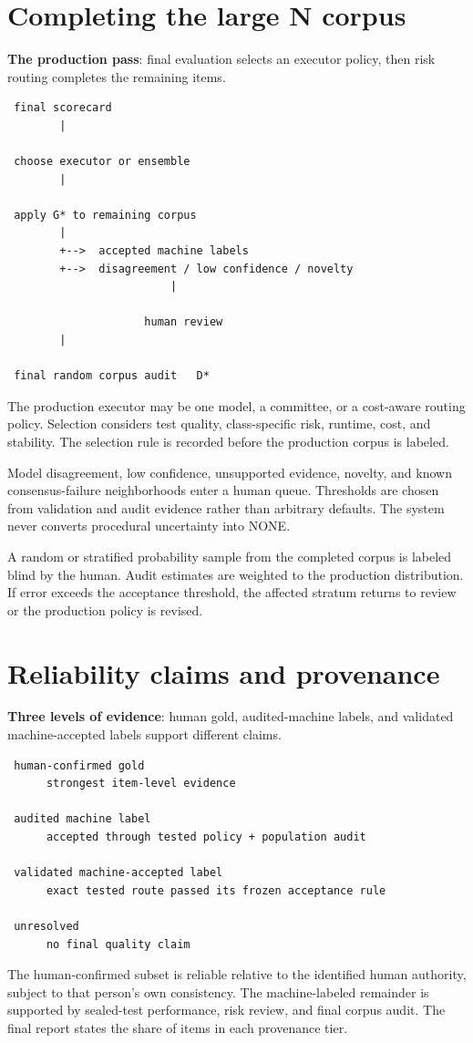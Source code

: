 \section{Completing the large N corpus}
\textbf{The production pass}: final evaluation selects an executor policy, then risk routing completes the remaining items.

\begin{verbatim}
 final scorecard
        |

 choose executor or ensemble
        |

 apply G* to remaining corpus
        |
        +-->  accepted machine labels
        +-->  disagreement / low confidence / novelty
                         |

                     human review
        |

 final random corpus audit   D*
\end{verbatim}
The production executor may be one model, a committee, or a cost-aware routing policy. Selection considers test quality, class-specific risk, runtime, cost, and stability. The selection rule is recorded before the production corpus is labeled.

Model disagreement, low confidence, unsupported evidence, novelty, and known consensus-failure neighborhoods enter a human queue. Thresholds are chosen from validation and audit evidence rather than arbitrary defaults. The system never converts procedural uncertainty into NONE.

A random or stratified probability sample from the completed corpus is labeled blind by the human. Audit estimates are weighted to the production distribution. If error exceeds the acceptance threshold, the affected stratum returns to review or the production policy is revised.


\section{Reliability claims and provenance}
\textbf{Three levels of evidence}: human gold, audited-machine labels, and validated machine-accepted labels support different claims.

\begin{verbatim}
 human-confirmed gold
      strongest item-level evidence

 audited machine label
      accepted through tested policy + population audit

 validated machine-accepted label
      exact tested route passed its frozen acceptance rule

 unresolved
      no final quality claim
\end{verbatim}
The human-confirmed subset is reliable relative to the identified human authority, subject to that person's own consistency. The machine-labeled remainder is supported by sealed-test performance, risk review, and final corpus audit. The final report states the share of items in each provenance tier.

